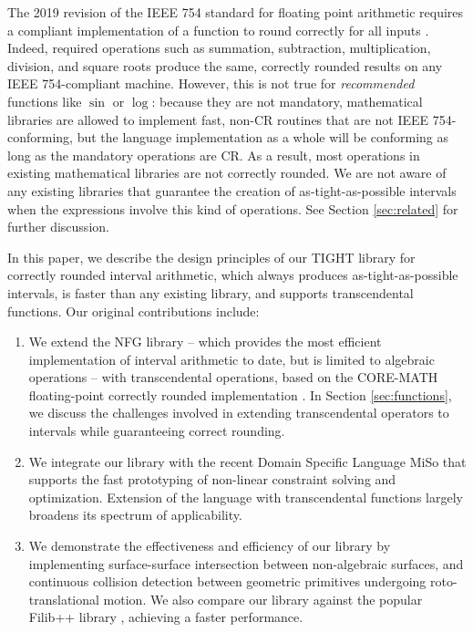 The 2019 revision of the IEEE 754 standard for floating point arithmetic requires a compliant implementation of a function to round correctly for all inputs \cite{ieee754}. Indeed, required operations such as summation, subtraction, multiplication, division, and square roots produce the same, correctly rounded results on any IEEE 754-compliant machine.
However, this is not true for \emph{recommended} functions like $\sin$ or $\log$: because they are not mandatory, mathematical libraries are allowed to implement fast, non-CR routines that are not IEEE 754-conforming, but the language implementation as a whole will be conforming as long as the mandatory operations are CR.
As a result, most operations in existing mathematical libraries are not correctly rounded.
We are not aware of any existing libraries that guarantee the creation of as-tight-as-possible intervals when the expressions involve this kind of operations.
See Section \ref{sec:related} for further discussion.

In this paper, we describe the design principles of our TIGHT library for correctly rounded interval arithmetic, which always produces as-tight-as-possible intervals, is faster than any existing library, and supports transcendental functions.
%
Our original contributions include:
\begin{enumerate}
\item We extend the NFG library \cite{nfg} -- which provides the most efficient implementation of interval arithmetic to date, but is limited to algebraic operations -- with transcendental operations, based on the CORE-MATH floating-point correctly rounded implementation \cite{Sibidanov2022}.
In Section \ref{sec:functions}, we discuss the challenges involved in extending transcendental operators to intervals while guaranteeing correct rounding. 
\item We integrate our library with the recent Domain Specific Language MiSo \cite{Sichetti2025} that supports the fast prototyping of non-linear constraint solving and optimization. 
Extension of the language with transcendental functions largely broadens its spectrum of applicability. 
\item We demonstrate the effectiveness and efficiency of our library by implementing surface-surface intersection between non-algebraic surfaces, and continuous collision detection between geometric primitives undergoing roto-translational motion.  We also compare our library against the popular Filib++ library \cite{filibpp}, achieving a faster performance.
\end{enumerate}


